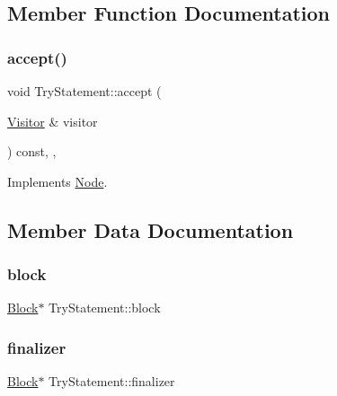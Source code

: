 \subsection{Member Function Documentation}
\mbox{\label{struct_try_statement_af223e8205727843aa77651caeb89b805}} 
\subsubsection{\texorpdfstring{accept()}{accept()}}
{\footnotesize\ttfamily void Try\+Statement\+::accept (\begin{DoxyParamCaption}\item[{\hyperlink{struct_visitor}{Visitor} \&}]{visitor }\end{DoxyParamCaption}) const\hspace{0.3cm}{\ttfamily [inline]}, {\ttfamily [override]}, {\ttfamily [virtual]}}



Implements \hyperlink{struct_node_a10bd7af968140bbf5fa461298a969c71}{Node}.



\subsection{Member Data Documentation}
\mbox{\label{struct_try_statement_aeea1fa5fce0062d0f8d427d4706d1f73}} 
\subsubsection{\texorpdfstring{block}{block}}
{\footnotesize\ttfamily \hyperlink{struct_block}{Block}$\ast$ Try\+Statement\+::block}

\mbox{\label{struct_try_statement_a95cbb6dbd527aad85fa40f0b8b98b66c}} 
\subsubsection{\texorpdfstring{finalizer}{finalizer}}
{\footnotesize\ttfamily \hyperlink{struct_block}{Block}$\ast$ Try\+Statement\+::finalizer}

